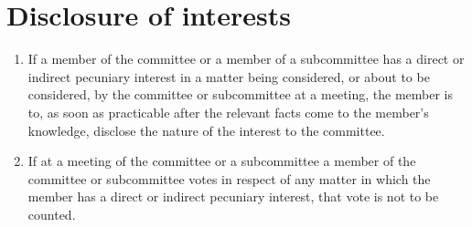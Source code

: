 \section{Disclosure of interests}
\label{rule:disclosure}

\begin{enumerate}
	\item If a member of the committee or a member of a subcommittee has a direct or indirect pecuniary interest in a matter being considered, or about to be considered, by the committee or subcommittee at a meeting, the member is to, as soon as practicable after the relevant facts come to the member's knowledge, disclose the nature of the interest to the committee.
	\item If at a meeting of the committee or a subcommittee a member of the committee or subcommittee votes in respect of any matter in which the member has a direct or indirect pecuniary interest, that vote is not to be counted.
\end{enumerate}
